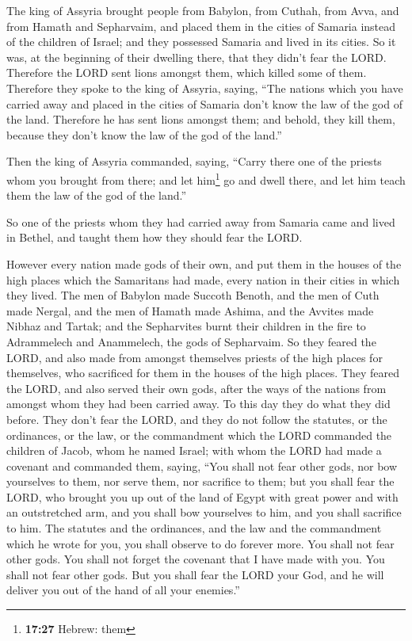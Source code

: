  The king of Assyria brought people from Babylon, from
Cuthah, from Avva, and from Hamath and Sepharvaim, and placed them in
the cities of Samaria instead of the children of Israel; and they
possessed Samaria and lived in its cities.  So it was, at
the beginning of their dwelling there, that they didn't fear the LORD.
Therefore the LORD sent lions amongst them, which killed some of them.
 Therefore they spoke to the king of Assyria, saying,
``The nations which you have carried away and placed in the cities of
Samaria don't know the law of the god of the land. Therefore he has sent
lions amongst them; and behold, they kill them, because they don't know
the law of the god of the land.''

 Then the king of Assyria commanded, saying, ``Carry
there one of the priests whom you brought from there; and let
him\footnote{\textbf{17:27} Hebrew: them} go and dwell there, and let
him teach them the law of the god of the land.''

 So one of the priests whom they had carried away from
Samaria came and lived in Bethel, and taught them how they should fear
the LORD.

 However every nation made gods of their own, and put
them in the houses of the high places which the Samaritans had made,
every nation in their cities in which they lived.  The
men of Babylon made Succoth Benoth, and the men of Cuth made Nergal, and
the men of Hamath made Ashima,  and the Avvites made
Nibhaz and Tartak; and the Sepharvites burnt their children in the fire
to Adrammelech and Anammelech, the gods of Sepharvaim. 
So they feared the LORD, and also made from amongst themselves priests
of the high places for themselves, who sacrificed for them in the houses
of the high places.  They feared the LORD, and also
served their own gods, after the ways of the nations from amongst whom
they had been carried away.  To this day they do what
they did before. They don't fear the LORD, and they do not follow the
statutes, or the ordinances, or the law, or the commandment which the
LORD commanded the children of Jacob, whom he named Israel;
 with whom the LORD had made a covenant and commanded
them, saying, ``You shall not fear other gods, nor bow yourselves to
them, nor serve them, nor sacrifice to them;  but you
shall fear the LORD, who brought you up out of the land of Egypt with
great power and with an outstretched arm, and you shall bow yourselves
to him, and you shall sacrifice to him.  The statutes and
the ordinances, and the law and the commandment which he wrote for you,
you shall observe to do forever more. You shall not fear other gods.
 You shall not forget the covenant that I have made with
you. You shall not fear other gods.  But you shall fear
the LORD your God, and he will deliver you out of the hand of all your
enemies.''

